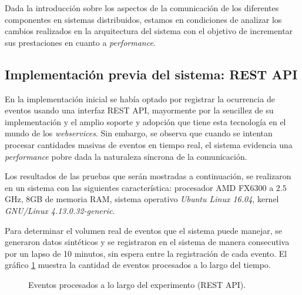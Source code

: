 \documentclass[a4paper,10pt, oneside]{article}
\begin{document}
Dada la introducción sobre los aspectos de la comunicación de los diferentes componentes en sistemas distribuidos, estamos en condiciones de analizar los cambios realizados en la arquitectura del sistema con el objetivo de incrementar sus prestaciones en cuanto a \textit{performance}.

\subsection{Implementación previa del sistema: REST API}

En la implementación inicial se había optado por registrar la ocurrencia de eventos usando una interfaz REST API, mayormente por la sencillez de su implementación y el amplio soporte y adopción que tiene esta tecnología en el mundo de los \textit{webservices}. Sin embargo, se observa que cuando se intentan procesar cantidades masivas de eventos en tiempo real, el sistema evidencia una \textit{performance} pobre dada la naturaleza síncrona de la comunicación.

Los resultados de las pruebas que serán mostradas a continuación, se realizaron en un sistema con las siguientes característica: procesador AMD FX6300 a $2.5$ GHz, 8GB de memoria RAM, sistema operativo \textit{Ubuntu Linux 16.04}, kernel \textit{GNU/Linux 4.13.0.32-generic}.

Para determinar el volumen real de eventos que el sistema puede manejar, se generaron datos sintéticos y se registraron en el sistema de manera consecutiva por un lapso de 10 minutos, sin espera entre la registración de cada evento. El gráfico \ref{fig:REST} muestra la cantidad de eventos procesados a lo largo del tiempo.

\begin{figure}[htpb]
	\centering

\caption{Eventos procesados a lo largo del experimento (REST API).} \label{fig:REST}
\end{figure}
\end{document}
